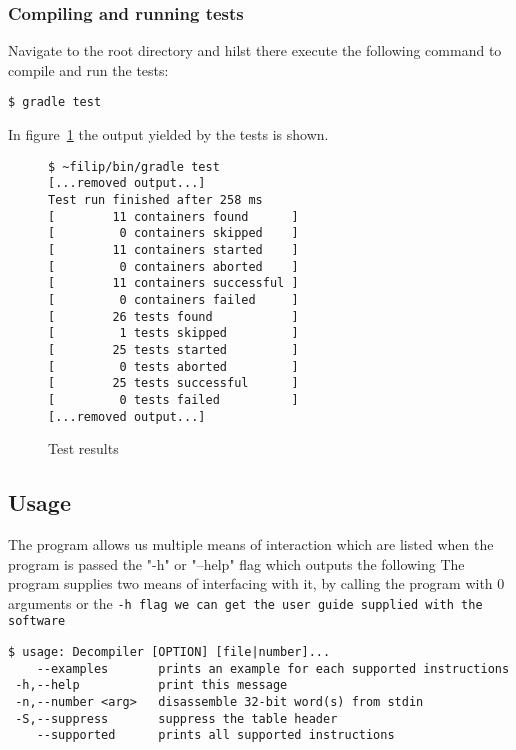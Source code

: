\subsubsection{Compiling and running tests}

Navigate to the root directory and hilst there execute the following
command to compile and run the tests:

\begin{verbatim}
$ gradle test
\end{verbatim}

In figure~\ref{fig:tests} the output yielded by the tests is shown.

\begin{landscape}
\thispagestyle{empty}
\cfoot{}
\begin{figure}[htpb]
\begin{lstlisting}[style=plain]
$ ~filip/bin/gradle test             
[...removed output...]
Test run finished after 258 ms
[        11 containers found      ]
[         0 containers skipped    ]
[        11 containers started    ]
[         0 containers aborted    ]
[        11 containers successful ]
[         0 containers failed     ]
[        26 tests found           ]
[         1 tests skipped         ]
[        25 tests started         ]
[         0 tests aborted         ]
[        25 tests successful      ]
[         0 tests failed          ]
[...removed output...]
\end{lstlisting}
\caption{Test results}
\label{fig:tests}
\end{figure}
\end{landscape}

\subsection{Usage}

The program allows us multiple means of interaction which are listed
when the program is passed the "-h" or "--help" flag which outputs the following
The program supplies two means of interfacing with it, by calling
the program with 0 arguments or the \tt{-h} flag we can get the
user guide supplied with the software

\begin{lstlisting}[style=plain]
$ usage: Decompiler [OPTION] [file|number]...
    --examples       prints an example for each supported instructions
 -h,--help           print this message
 -n,--number <arg>   disassemble 32-bit word(s) from stdin
 -S,--suppress       suppress the table header
    --supported      prints all supported instructions
\end{lstlisting}

